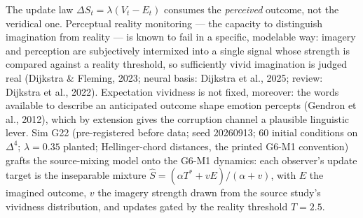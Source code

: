 \documentclass[
]{article}
\begin{document}
The update law \(\Delta S_t = \lambda(V_t - E_t)\) consumes the
\emph{perceived} outcome, not the veridical one. Perceptual reality
monitoring --- the capacity to distinguish imagination from reality ---
is known to fail in a specific, modelable way: imagery and perception
are subjectively intermixed into a single signal whose strength is
compared against a reality threshold, so sufficiently vivid imagination
is judged real (Dijkstra \& Fleming, 2023; neural basis: Dijkstra et
al., 2025; review: Dijkstra et al., 2022). Expectation vividness is not
fixed, moreover: the words available to describe an anticipated outcome
shape emotion percepts (Gendron et al., 2012), which by extension gives
the corruption channel a plausible linguistic lever. Sim G22
(pre-registered before data; seed 20260913; 60 initial conditions on
\(\Delta^{4}\); \(\lambda = 0.35\) planted; Hellinger-chord distances,
the printed G6-M1 convention) grafts the source-mixing model onto the
G6-M1 dynamics: each observer's update target is the inseparable mixture
\(\hat{S} = (\alpha T^{*} + v E)/(\alpha + v)\), with \(E\) the imagined
outcome, \(v\) the imagery strength drawn from the source study's
vividness distribution, and updates gated by the reality threshold
\(T = 2.5\).
\end{document}
